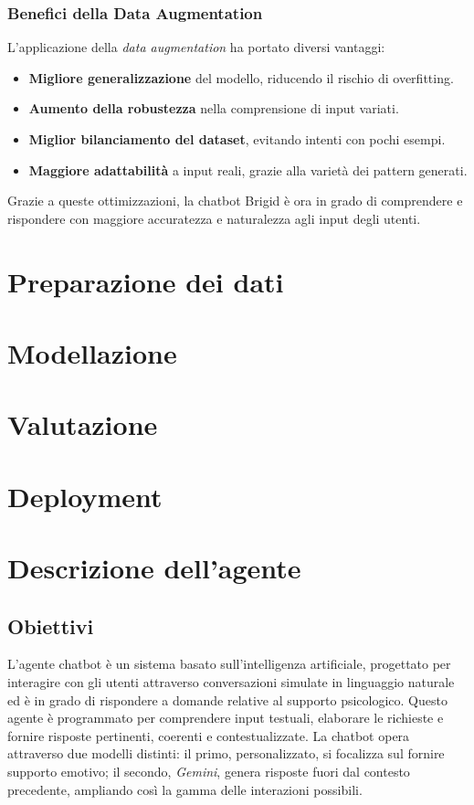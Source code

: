 \documentclass[12pt, letterpaper]{article}
\begin{document}
\subsubsection{Benefici della Data Augmentation}
L’applicazione della \textit{data augmentation} ha portato diversi vantaggi:
\begin{itemize}
	\item \textbf{Migliore generalizzazione} del modello, riducendo il rischio di overfitting.
	\item \textbf{Aumento della robustezza} nella comprensione di input variati.
	\item \textbf{Miglior bilanciamento del dataset}, evitando intenti con pochi esempi.
	\item \textbf{Maggiore adattabilità} a input reali, grazie alla varietà dei pattern generati.
\end{itemize}
Grazie a queste ottimizzazioni, la chatbot Brigid è ora in grado di comprendere e rispondere con maggiore accuratezza e naturalezza agli input degli utenti.


\section{Preparazione dei dati}

\section{Modellazione}

\section{Valutazione}

\section{Deployment}

\section{Descrizione dell'agente}
\subsection{Obiettivi}
L'agente chatbot è un sistema basato sull'intelligenza artificiale, progettato per interagire con gli utenti attraverso conversazioni simulate in linguaggio naturale ed è in grado di rispondere a domande relative al supporto psicologico. Questo agente è programmato per comprendere input testuali, elaborare le richieste e fornire risposte pertinenti, coerenti e contestualizzate.
La chatbot opera attraverso due modelli distinti: il primo, personalizzato, si focalizza sul fornire supporto emotivo; il secondo, \textit{Gemini}, genera risposte fuori dal contesto precedente, ampliando così la gamma delle interazioni possibili.
\end{document}
